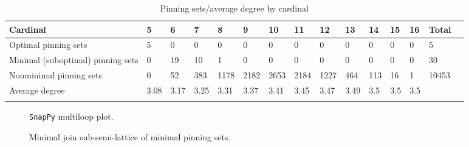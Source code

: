 \documentclass{article}%
\begin{document}
\begin{table}[ht]
	\caption{Pinning sets/average degree by cardinal}
	\centering
	\renewcommand{\arraystretch}{1.5}
	\begin{tabularx}{\textwidth}{lXXXXXXXXXXXXXX}
		\toprule
			Cardinal & 5 & 6 & 7 & 8 & 9 & 10 & 11 & 12 & 13 & 14 & 15 & 16 & Total\\
			\hline
			Optimal pinning sets & 5 & 0 & 0 & 0 & 0 & 0 & 0 & 0 & 0 & 0 & 0 & 0 & 5 \\
			Minimal (suboptimal) pinning sets & 0 & 19 & 10 & 1 & 0 & 0 & 0 & 0 & 0 & 0 & 0 & 0 & 30 \\
			Nonminimal pinning sets & 0 & 52 & 383 & 1178 & 2182 & 2653 & 2184 & 1227 & 464 & 113 & 16 & 1 & 10453 \\
			Average degree & 3.08 & 3.17 & 3.25 & 3.31 & 3.37 & 3.41 & 3.45 & 3.47 & 3.49 & 3.5 & 3.5 & 3.5 &  \\
		\bottomrule \\ 
	\end{tabularx}
\end{table}

\begin{multicols}{2}
\begin{figure}[H]
\centering

\caption{\texttt{SnapPy} multiloop plot.}
\label{fig:tex/img/[[16, 28, 1, 17], [17, 22, 18, 23], [23, 15, 24, 16], [27, 11, 28, 12], [1, 21, 2, 22], [18, 9, 19, 8], [14, 7, 15, 8], [24, 7, 25, 6], [12, 6, 13, 5], [26, 4, 27, 5], [20, 10, 21, 11], [2, 10, 3, 9],.svg}
\end{figure}
\columnbreak

\begin{figure}[H]
\centering
\scalebox{0.8}{}
\caption{Minimal join sub-semi-lattice of minimal pinning sets.}
\label{fig:tex/img/[[16, 28, 1, 17], [17, 22, 18, 23], [23, 15, 24, 16], [27, 11, 28, 12], [1, 21, 2, 22], [18, 9, 19, 8], [14, 7, 15, 8], [24, 7, 25, 6], [12, 6, 13, 5], [26, 4, 27, 5], [20, 10, 21, 11], [2, 10, 3, 9],.pgf}
\end{figure}
\end{multicols}
\end{document}

